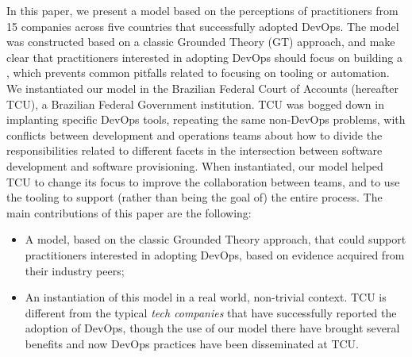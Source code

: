 In this paper, we present a model based on the perceptions of practitioners from
15 companies across five countries that successfully adopted DevOps. The model
was constructed based on a classic Grounded Theory (GT) approach,
and make clear that practitioners interested in adopting DevOps should focus on building a
\cc, which prevents common pitfalls related to focusing on tooling or automation.
We instantiated our model in the Brazilian Federal Court of
Accounts (hereafter TCU), a Brazilian Federal Government institution. TCU was
bogged down in implanting specific DevOps tools, repeating the same non-DevOps
problems, with conflicts between development and operations teams about how to
divide the responsibilities related to different facets in the intersection
between software development and software provisioning. When instantiated,
our model helped TCU to change its focus to improve the collaboration between teams, and to use the tooling
to support (rather than being the goal of) the entire process.
The main contributions of this paper are the following:

\begin{itemize}
\item A model, based on the classic Grounded Theory approach, that could support practitioners interested in adopting DevOps,
      based on evidence acquired from their industry peers;
\item An instantiation of this model in a real world, non-trivial context. TCU is different from the typical \emph{tech companies}
that have successfully reported the adoption of DevOps, though the use of our model there have brought several benefits and
now DevOps practices have been disseminated at TCU.
\end{itemize}
